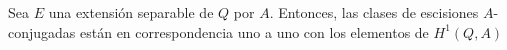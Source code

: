 
\begin{teorema}\label{h1}
	Sea $E$ una extensión separable de $Q$ por $A$. Entonces, las clases de escisiones $A$-conjugadas están en correspondencia uno a uno con los elementos de $H^1(Q,A)$
\end{teorema}

